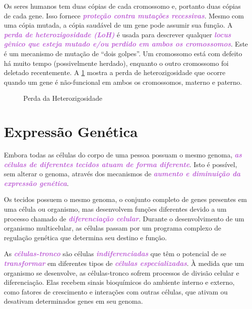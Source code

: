 \documentclass[11pt,a4paper]{article}
\begin{document}
	Os seres humanos tem duas cópias de cada cromossomo e, portanto duas cópias de cada gene. Isso fornece \textcolor{MediumOrchid}{\textbf{\textit{proteção contra mutações recessivas}}}. Mesmo com uma cópia mutada, a cópia saudável de um gene pode assumir sua função. A \textcolor{MediumOrchid}{\textbf{\textit{perda de heterozigosidade (LoH)}}} é usada para descrever qualquer \textcolor{MediumOrchid}{\textbf{\textit{locus gênico que esteja mutado e/ou perdido em ambos os cromossomos}}}. Este é um mecanismo de mutação de “dois golpes”. Um cromossomo está com defeito há muito tempo (possivelmente herdado), enquanto o outro cromossomo foi deletado recentemente. A \ref{fig:perdaDaHeterozigosidade} mostra a perda de heterozigosidade que ocorre quando um gene é não-funcional em ambos os cromossomos, materno e paterno.

			\begin{figure}[h]
				\centering
				\caption{Perda da Heterozigosidade}
				\label{fig:perdaDaHeterozigosidade}
			\end{figure}

\section{Expressão Genética}
	
	Embora todas as células do corpo de uma pessoa possuam o mesmo genoma, \textcolor{MediumOrchid}{\textbf{\textit{as células de diferentes tecidos atuam de forma diferente}}}. Isto é possível, sem alterar o genoma, através dos mecanismos de \textcolor{MediumOrchid}{\textbf{\textit{aumento e diminuição da expressão genética}}}.

	Os tecidos possuem o mesmo genoma, o conjunto completo de genes presentes em uma célula ou organismo, mas desenvolvem funções diferentes devido a um processo chamado de \textcolor{MediumOrchid}{\textbf{\textit{diferenciação celular}}}. Durante o desenvolvimento de um organismo multicelular, as células passam por um programa complexo de regulação genética que determina seu destino e função.

	As \textcolor{MediumOrchid}{\textbf{\textit{células-tronco}}} são células \textcolor{MediumOrchid}{\textbf{\textit{indiferenciadas}}} que têm o potencial de se \textcolor{MediumOrchid}{\textbf{\textit{transformar}}} em diferentes tipos de \textcolor{MediumOrchid}{\textbf{\textit{células especializadas}}}. À medida que um organismo se desenvolve, as células-tronco sofrem processos de divisão celular e diferenciação. Elas recebem sinais bioquímicos do ambiente interno e externo, como fatores de crescimento e interações com outras células, que ativam ou desativam determinados genes em seu genoma.
\end{document}
